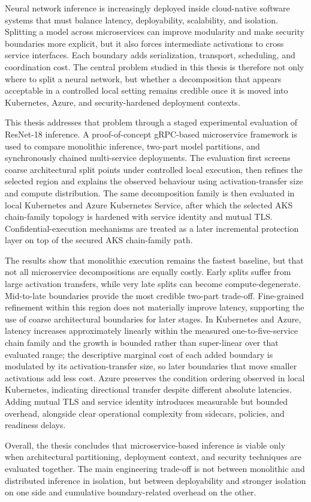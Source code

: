 Neural network inference is increasingly deployed inside cloud-native software systems that must balance latency, deployability, scalability, and isolation. Splitting a model across microservices can improve modularity and make security boundaries more explicit, but it also forces intermediate activations to cross service interfaces. Each boundary adds serialization, transport, scheduling, and coordination cost. The central problem studied in this thesis is therefore not only where to split a neural network, but whether a decomposition that appears acceptable in a controlled local setting remains credible once it is moved into Kubernetes, Azure, and security-hardened deployment contexts.

This thesis addresses that problem through a staged experimental evaluation of ResNet-18 inference. A proof-of-concept gRPC-based microservice framework is used to compare monolithic inference, two-part model partitions, and synchronously chained multi-service deployments. The evaluation first screens coarse architectural split points under controlled local execution, then refines the selected region and explains the observed behaviour using activation-transfer size and compute distribution. The same decomposition family is then evaluated in local Kubernetes and Azure Kubernetes Service, after which the selected AKS chain-family topology is hardened with service identity and mutual TLS. Confidential-execution mechanisms are treated as a later incremental protection layer on top of the secured AKS chain-family path.

The results show that monolithic execution remains the fastest baseline, but that not all microservice decompositions are equally costly. Early splits suffer from large activation transfers, while very late splits can become compute-degenerate. Mid-to-late boundaries provide the most credible two-part trade-off. Fine-grained refinement within this region does not materially improve latency, supporting the use of coarse architectural boundaries for later stages. In Kubernetes and Azure, latency increases approximately linearly within the measured one-to-five-service chain family and the growth is bounded rather than super-linear over that evaluated range; the descriptive marginal cost of each added boundary is modulated by its activation-transfer size, so later boundaries that move smaller activations add less cost. Azure preserves the condition ordering observed in local Kubernetes, indicating directional transfer despite different absolute latencies. Adding mutual TLS and service identity introduces measurable but bounded overhead, alongside clear operational complexity from sidecars, policies, and readiness delays.

Overall, the thesis concludes that microservice-based inference is viable only when architectural partitioning, deployment context, and security techniques are evaluated together. The main engineering trade-off is not between monolithic and distributed inference in isolation, but between deployability and stronger isolation on one side and cumulative boundary-related overhead on the other.
